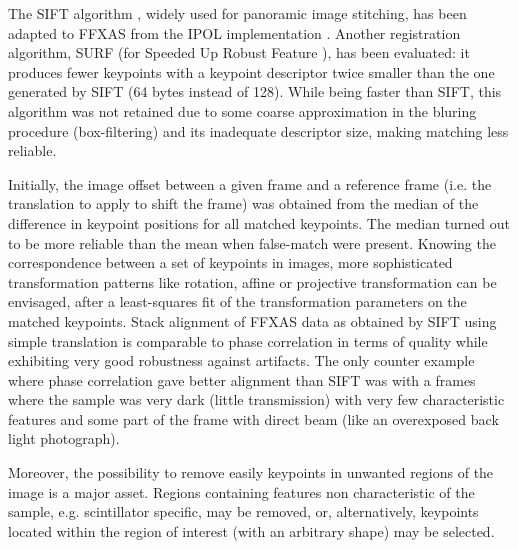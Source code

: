 \documentclass[preprint]{iucr}
\begin{document}
The SIFT algorithm \cite{Lowe99,Lowe04}, widely used for panoramic image
stitching, has been adapted to FFXAS from the IPOL implementation \cite{ASIFT}.
Another registration algorithm, SURF (for Speeded Up Robust Feature
\cite{surf}), has been evaluated: it produces fewer keypoints with a keypoint
descriptor twice smaller than the one generated by SIFT (64 bytes instead of
128).
While being faster than SIFT, this algorithm was not
retained due to some coarse approximation in the bluring procedure
(box-filtering) and its inadequate descriptor size, making matching less
reliable.

Initially, the image offset between a given frame and a reference frame (i.e.
the translation to apply to shift the frame) was obtained from the median
of the difference in keypoint positions for all matched keypoints. The median
turned out to be more reliable than the mean when false-match were present. 
Knowing the correspondence between a set of keypoints in images, more
sophisticated transformation patterns like rotation, affine or projective
transformation can be envisaged, after a least-squares fit of the 
transformation parameters on the matched keypoints. 
Stack alignment of FFXAS data as obtained by SIFT using simple translation is
comparable to phase correlation in terms of quality while exhibiting very good
robustness against artifacts. 
The only counter example where phase correlation gave
better alignment than SIFT was with a frames where the sample was very dark
(little transmission) with very few characteristic features and some part of the
frame with direct beam (like an overexposed back light photograph).

Moreover, the possibility to remove easily keypoints in unwanted regions of 
the image is a major asset. 
Regions containing features non characteristic of the sample, e.g. scintillator 
specific, may be removed, or, alternatively, keypoints located within the 
region of interest (with an arbitrary shape) may be selected.
\end{document}
